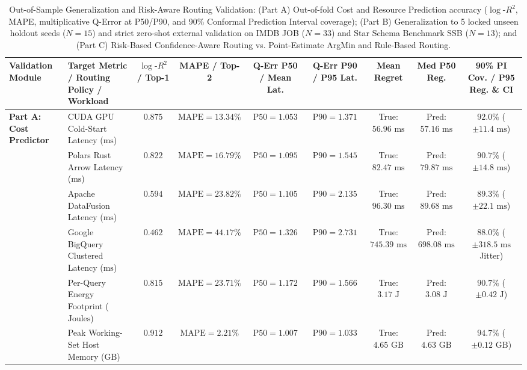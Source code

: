 \documentclass[10pt,a4paper]{article}
\newenvironment{fitasttable}{%
  \begin{lrbox}{\asttblbox}%
}{%
  \end{lrbox}%
  \sbox{\asttblboxB}{%
    \ifdim\wd\asttblbox>0.96\textwidth
      \resizebox{0.96\textwidth}{!}{\usebox{\asttblbox}}%
    \else
      \usebox{\asttblbox}%
    \fi
  }%
  \ifdim\ht\asttblboxB>0.72\textheight
    \resizebox{!}{0.72\textheight}{\usebox{\asttblboxB}}%
  \else
    \usebox{\asttblboxB}%
  \fi
}
\begin{document}
\begin{table}[!htbp]
\centering
\caption{Out-of-Sample Generalization and Risk-Aware Routing Validation: (Part A) Out-of-fold Cost and Resource Prediction accuracy ($\log\text{-}R^2$, MAPE, multiplicative Q-Error at P50/P90, and 90\% Conformal Prediction Interval coverage); (Part B) Generalization to 5 locked unseen holdout seeds ($N=15$) and strict zero-shot external validation on IMDB JOB ($N=33$) and Star Schema Benchmark SSB ($N=13$); and (Part C) Risk-Based Confidence-Aware Routing vs. Point-Estimate ArgMin and Rule-Based Routing.}\label{tab:jbd_unseen_t11}
\label{tab:priority3_validation}
\scriptsize
\setlength{\tabcolsep}{3.2pt}
\renewcommand{\arraystretch}{1.10}
\begin{fitasttable}
\begin{tabular}{@{}llccccccc@{}}
\toprule
\textbf{Validation Module} & \textbf{Target Metric / Routing Policy / Workload} & \textbf{$\log\text{-}R^2$ / Top-1} & \textbf{MAPE / Top-2} & \textbf{Q-Err P50 / Mean Lat.} & \textbf{Q-Err P90 / P95 Lat.} & \textbf{Mean Regret} & \textbf{Med P50 Reg.} & \textbf{90\% PI Cov. / P95 Reg. \& CI} \\
\midrule
\multirow{6}{*}{\textbf{Part A: Cost Predictor}}
 & CUDA GPU Cold-Start Latency ($\text{ms}$) & $0.875$ & $\text{MAPE}=13.34\%$ & $\text{P50}=1.053$ & $\text{P90}=1.371$ & True: $56.96\text{ ms}$ & Pred: $57.16\text{ ms}$ & $92.0\%$ ($\pm 11.4\text{ ms}$) \\
 & Polars Rust Arrow Latency ($\text{ms}$) & $0.822$ & $\text{MAPE}=16.79\%$ & $\text{P50}=1.095$ & $\text{P90}=1.545$ & True: $82.47\text{ ms}$ & Pred: $79.87\text{ ms}$ & $90.7\%$ ($\pm 14.8\text{ ms}$) \\
 & Apache DataFusion Latency ($\text{ms}$) & $0.594$ & $\text{MAPE}=23.82\%$ & $\text{P50}=1.105$ & $\text{P90}=2.135$ & True: $96.30\text{ ms}$ & Pred: $89.68\text{ ms}$ & $89.3\%$ ($\pm 22.1\text{ ms}$) \\
 & Google BigQuery Clustered Latency ($\text{ms}$) & $0.462$ & $\text{MAPE}=44.17\%$ & $\text{P50}=1.326$ & $\text{P90}=2.731$ & True: $745.39\text{ ms}$ & Pred: $698.08\text{ ms}$ & $88.0\%$ ($\pm 318.5\text{ ms}$ Jitter) \\
 & Per-Query Energy Footprint ($\text{Joules}$) & $0.815$ & $\text{MAPE}=23.71\%$ & $\text{P50}=1.172$ & $\text{P90}=1.566$ & True: $3.17\text{ J}$ & Pred: $3.08\text{ J}$ & $90.7\%$ ($\pm 0.42\text{ J}$) \\
 & Peak Working-Set Host Memory ($\text{GB}$) & $0.912$ & $\text{MAPE}=2.21\%$ & $\text{P50}=1.007$ & $\text{P90}=1.033$ & True: $4.65\text{ GB}$ & Pred: $4.63\text{ GB}$ & $94.7\%$ ($\pm 0.12\text{ GB}$) \\

\end{tabular}
\end{fitasttable}
\end{table}
\end{document}
